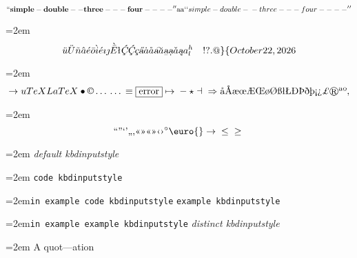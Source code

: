 \documentclass{book}
\begin{document}
\endgroup{}$$
\mathbf{``simple-double--three---four----''} \hbox{aa}
`\hbox{}`simple-double-\hbox{}-three---four----'\hbox{}'
$$
\par\begingroup\obeylines\obeyspaces\frenchspacing\leftskip=2em\relax\parskip=0pt\relax\ttfamily{}
\endgroup{}$$
\ddot{u} \ddot{U} \tilde{n} \hat{a} \acute{e} \bar{o} \grave{i} \acute{e} \imath{} \jmath{} \grave{\bar{E}}
\mathord{\text{\l{}}} \textsl{\c{\'{C}}} \textsl{\c{\'{C}}} \textsl{\c{c}} \textsl{\H{a}} \dot{a} \mathring{a} \textsl{\t{a}}
\breve{a} \textsl{\b{a}} \textsl{\d{a}} \check{a} \textsl{\k{a}} a^{h}_{l}
 \ {}\ {} \ {}\-{}   ! ? . @ \} \{ 
\today{}
$$
\par\begingroup\obeylines\obeyspaces\frenchspacing\leftskip=2em\relax\parskip=0pt\relax\ttfamily{}
\endgroup{}$$
\rightarrow{}
u
TeX LaTeX \bullet{} \copyright{} \dots{} \dots{} \equiv{}
\fbox{error} \mapsto{} - \star{} \dashv{} \Rightarrow{}
\mathord{\text{\aa{}}} \mathord{\text{\AA{}}} \mathord{\text{\ae{}}} \mathord{\text{\oe{}}} \mathord{\text{\AE{}}} \mathord{\text{\OE{}}} \mathord{\text{\o{}}} \mathord{\text{\O{}}} \mathord{\text{\ss{}}} \mathord{\text{\l{}}} \mathord{\text{\L{}}} \mathord{\text{\DH{}}}
\mathord{\text{\TH{}}} \mathord{\text{\dh{}}} \mathord{\text{\th{}}} \mathord{\text{\textexclamdown{}}} \mathord{\text{\textquestiondown{}}} \mathsterling{}
\circledR{} \mathord{\text{\textordfeminine{}}} \mathord{\text{\textordmasculine{}}} , 
$$
\par\begingroup\obeylines\obeyspaces\frenchspacing\leftskip=2em\relax\parskip=0pt\relax\ttfamily{}
\endgroup{}$$
\mathord{\text{\textquotedblleft{}}} \mathord{\text{\textquotedblright{}}} 
\mathord{\text{\textquoteleft{}}} \mathord{\text{\textquoteright{}}} \mathord{\text{\quotedblbase{}}} \mathord{\text{\quotesinglbase{}}} \mathord{\text{\guillemotleft{}}}
\mathord{\text{\guillemotright{}}} \mathord{\text{\guillemotleft{}}} \mathord{\text{\guillemotright{}}} \mathord{\text{\guilsinglleft{}}}
\mathord{\text{\guilsinglright{}}} ^{\circ{}} \euro{} \rightarrow{} \leq{} \geq{}
$$
\par\begingroup\obeylines\obeyspaces\frenchspacing\leftskip=2em\relax\parskip=0pt\relax\ttfamily{}
{\ttfamily\textsl{default kbdinputstyle}}
\par\begingroup\obeylines\obeyspaces\frenchspacing\leftskip=2em\relax\parskip=0pt\relax{}
\endgroup{}
\texttt{code kbdinputstyle}
\par\begingroup\obeylines\obeyspaces\frenchspacing\leftskip=2em\relax\parskip=0pt\relax\ttfamily{}\texttt{in example code kbdinputstyle}
\endgroup{}
\texttt{example kbdinputstyle}
\par\begingroup\obeylines\obeyspaces\frenchspacing\leftskip=2em\relax\parskip=0pt\relax\ttfamily{}\texttt{in example example kbdinputstyle}
\endgroup{}
{\ttfamily\textsl{distinct kbdinputstyle}}
\par\begingroup\obeylines\obeyspaces\frenchspacing\leftskip=2em\relax\parskip=0pt\relax{}
\endgroup{}
A quot---ation
\end{document}
